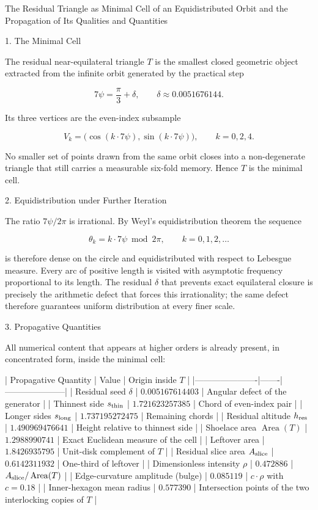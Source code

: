 The Residual Triangle as Minimal Cell of an Equidistributed Orbit and the Propagation of Its Qualities and Quantities

1. The Minimal Cell

The residual near-equilateral triangle \(T\) is the smallest closed geometric object extracted from the infinite orbit generated by the practical step

\[
7\psi = \frac{\pi}{3} + \delta, \qquad \delta \approx 0.0051676144.
\]

Its three vertices are the even-index subsample

\[
V_k = \bigl(\cos(k\cdot 7\psi),\sin(k\cdot 7\psi)\bigr), \qquad k = 0,2,4.
\]

No smaller set of points drawn from the same orbit closes into a non-degenerate triangle that still carries a measurable six-fold memory. Hence \(T\) is the minimal cell.

2. Equidistribution under Further Iteration

The ratio \(7\psi/2\pi\) is irrational. By Weyl’s equidistribution theorem the sequence

\[
\theta_k = k\cdot 7\psi \bmod 2\pi, \qquad k = 0,1,2,\dots
\]

is therefore dense on the circle and equidistributed with respect to Lebesgue measure. Every arc of positive length is visited with asymptotic frequency proportional to its length. The residual \(\delta\) that prevents exact equilateral closure is precisely the arithmetic defect that forces this irrationality; the same defect therefore guarantees uniform distribution at every finer scale.

3. Propagative Quantities

All numerical content that appears at higher orders is already present, in concentrated form, inside the minimal cell:

| Propagative Quantity | Value | Origin inside \(T\) |
|----------------------|-------|---------------------|
| Residual seed \(\delta\) | \(0.005167614403\) | Angular defect of the generator |
| Thinnest side \(s_{\rm thin}\) | \(1.721623257385\) | Chord of even-index pair |
| Longer sides \(s_{\rm long}\) | \(1.737195272475\) | Remaining chords |
| Residual altitude \(h_{\rm res}\) | \(1.490969476641\) | Height relative to thinnest side |
| Shoelace area \(\operatorname{Area}(T)\) | \(1.2988990741\) | Exact Euclidean measure of the cell |
| Leftover area | \(1.8426935795\) | Unit-disk complement of \(T\) |
| Residual slice area \(A_{\rm slice}\) | \(0.6142311932\) | One-third of leftover |
| Dimensionless intensity \(\rho\) | \(0.472886\) | \(A_{\rm slice}/\operatorname{Area}(T)\) |
| Edge-curvature amplitude (bulge) | \(0.085119\) | \(c\cdot\rho\) with \(c=0.18\) |
| Inner-hexagon mean radius | \(0.577390\) | Intersection points of the two interlocking copies of \(T\) |

